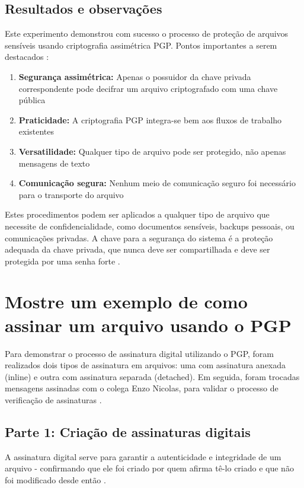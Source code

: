 \subsection{Resultados e observações}

Este experimento demonstrou com sucesso o processo de proteção de arquivos sensíveis usando criptografia assimétrica PGP. Pontos importantes a serem destacados \cite{gnupgdoc}:

\begin{enumerate}
    \item \textbf{Segurança assimétrica:} Apenas o possuidor da chave privada correspondente pode decifrar um arquivo criptografado com uma chave pública
    \item \textbf{Praticidade:} A criptografia PGP integra-se bem aos fluxos de trabalho existentes
    \item \textbf{Versatilidade:} Qualquer tipo de arquivo pode ser protegido, não apenas mensagens de texto
    \item \textbf{Comunicação segura:} Nenhum meio de comunicação seguro foi necessário para o transporte do arquivo
\end{enumerate}

Estes procedimentos podem ser aplicados a qualquer tipo de arquivo que necessite de confidencialidade, como documentos sensíveis, backups pessoais, ou comunicações privadas. A chave para a segurança do sistema é a proteção adequada da chave privada, que nunca deve ser compartilhada e deve ser protegida por uma senha forte \cite{pgpbest}.

\section{Mostre um exemplo de como assinar um arquivo usando o PGP}

Para demonstrar o processo de assinatura digital utilizando o PGP, foram realizados dois tipos de assinatura em arquivos: uma com assinatura anexada (inline) e outra com assinatura separada (detached). Em seguida, foram trocadas mensagens assinadas com o colega Enzo Nicolas, para validar o processo de verificação de assinaturas \cite{gnupgkeysigning}.

\subsection{Parte 1: Criação de assinaturas digitais}

A assinatura digital serve para garantir a autenticidade e integridade de um arquivo - confirmando que ele foi criado por quem afirma tê-lo criado e que não foi modificado desde então \cite{rfc4880}.

